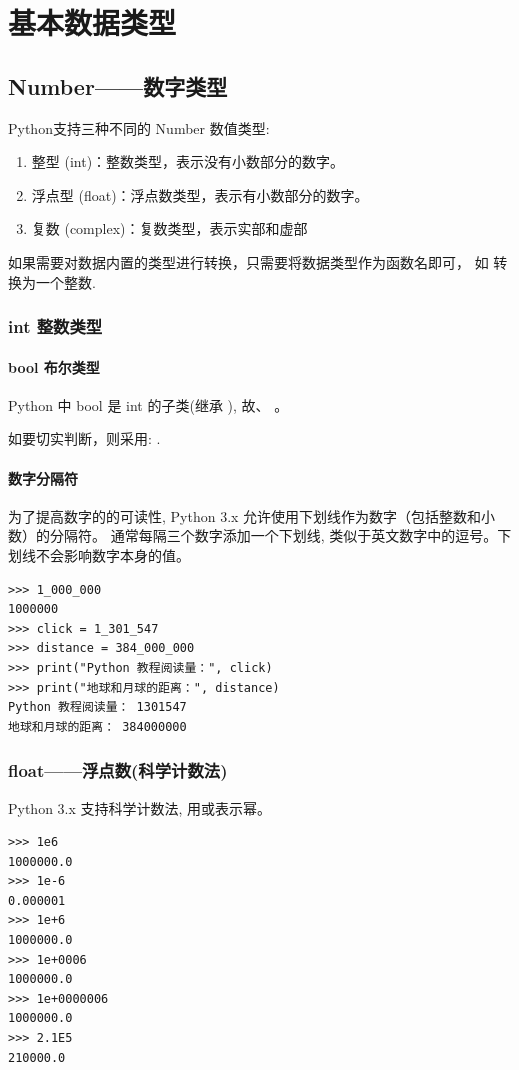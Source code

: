 \chapter{基本数据类型}

\section{Number——数字类型}
Python支持三种不同的 Number 数值类型:
\begin{enumerate}[label=\arabic*)]
    \item 整型 (int)：整数类型，表示没有小数部分的数字。
    \item 浮点型 (float)：浮点数类型，表示有小数部分的数字。
    \item 复数 (complex)：复数类型，表示实部和虚部
\end{enumerate}

如果需要对数据内置的类型进行转换，只需要将数据类型作为函数名即可，
如  转换为一个整数.

\subsection{int 整数类型}
\subsubsection{bool 布尔类型}
Python 中 bool 是 int 的子类(继承 ),
故、 。

如要切实判断，则采用: .

\subsubsection{数字分隔符}
为了提高数字的的可读性, Python 3.x 允许使用下划线\codeinline{\_}作为数字（包括整数和小数）的分隔符。
通常每隔三个数字添加一个下划线, 类似于英文数字中的逗号。下划线不会影响数字本身的值。

\begin{lstlisting}[style=demostyle,numbers=none]
>>> 1_000_000
1000000
>>> click = 1_301_547
>>> distance = 384_000_000
>>> print("Python 教程阅读量：", click)
>>> print("地球和月球的距离：", distance)
Python 教程阅读量： 1301547
地球和月球的距离： 384000000
\end{lstlisting}

\subsection{float——浮点数(科学计数法)}
Python 3.x 支持科学计数法, 用或表示幂。
\begin{lstlisting}[style=demostyle,numbers=none]
>>> 1e6
1000000.0
>>> 1e-6
0.000001
>>> 1e+6
1000000.0
>>> 1e+0006
1000000.0
>>> 1e+0000006
1000000.0
>>> 2.1E5
210000.0
\end{lstlisting}

